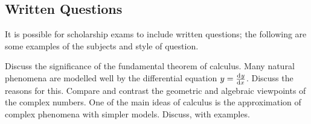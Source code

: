 \begin{questions}
\end{questions}

\subsection*{Written Questions}
It is possible for scholarship exams to include written questions; the following are some examples of the subjects and style of question.
\begin{questions}
  \question Discuss the significance of the fundamental theorem of calculus.
  \question Many natural phenomena are modelled well by the differential equation $ y = \od{y}{x} $. Discuss the reasons for this.
  \question Compare and contrast the geometric and algebraic viewpoints of the complex numbers.
  \question One of the main ideas of calculus is the approximation of complex phenomena with simpler models. Discuss, with examples.
\end{questions}


